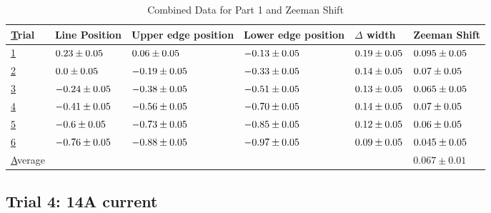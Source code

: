 \begin{table}
    \begin{adjustwidth}{-100pt}{-100pt}
        \centering
        \begin{tabular}{|l|l|l|l|l|l|}
            \hline
            {\ul Trial}   & Line Position                & Upper edge position          & Lower edge position          & $\Delta$ width              & Zeeman Shift                 \\ \hline
            {\ul 1}       & $0.23 \pm 0.05$  & $0.06 \pm 0.05$  & $-0.13 \pm 0.05$ & $0.19 \pm 0.05$ & $0.095 \pm 0.05$ \\ \hline
            {\ul 2}       & $0.0 \pm 0.05$   & $-0.19 \pm 0.05$ & $-0.33 \pm 0.05$ & $0.14 \pm 0.05$ & $0.07 \pm 0.05$  \\ \hline
            {\ul 3}       & $-0.24 \pm 0.05$ & $-0.38 \pm 0.05$ & $-0.51 \pm 0.05$ & $0.13 \pm 0.05$ & $0.065 \pm 0.05$ \\ \hline
            {\ul 4}       & $-0.41 \pm 0.05$ & $-0.56 \pm 0.05$ & $-0.70 \pm 0.05$ & $0.14 \pm 0.05$ & $0.07 \pm 0.05$  \\ \hline
            {\ul 5}       & $-0.6 \pm 0.05$  & $-0.73 \pm 0.05$ & $-0.85 \pm 0.05$ & $0.12 \pm 0.05$ & $0.06 \pm 0.05$  \\ \hline
            {\ul 6}       & $-0.76 \pm 0.05$ & $-0.88 \pm 0.05$ & $-0.97 \pm 0.05$ & $0.09 \pm 0.05$ & $0.045 \pm 0.05$ \\ \hline
            {\ul Average} &                              &                              &                              &                             & $0.067 \pm 0.01$             \\ \hline
        \end{tabular}
    \end{adjustwidth}
    \caption{Combined Data for Part 1 and Zeeman Shift}
\end{table}


\subsection{Trial 4: 14A current}

